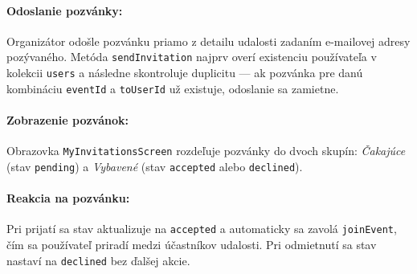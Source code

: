   \paragraph{Odoslanie pozvánky:}
  Organizátor odošle pozvánku priamo z detailu udalosti zadaním
  e-mailovej adresy pozývaného. Metóda \texttt{sendInvitation} najprv
  overí existenciu používateľa v kolekcii \texttt{users} a následne
  skontroluje duplicitu — ak pozvánka pre danú kombináciu
  \texttt{eventId} a \texttt{toUserId} už existuje, odoslanie sa zamietne.

  \paragraph{Zobrazenie pozvánok:}
  Obrazovka \texttt{MyInvitationsScreen} rozdeľuje pozvánky do dvoch
  skupín: \textit{Čakajúce} (stav \texttt{pending}) a \textit{Vybavené}
  (stav \texttt{accepted} alebo \texttt{declined}).

  \paragraph{Reakcia na pozvánku:}
  Pri prijatí sa stav aktualizuje na \texttt{accepted} a automaticky
  sa zavolá \texttt{joinEvent}, čím sa používateľ priradí medzi
  účastníkov udalosti. Pri odmietnutí sa stav nastaví na
  \texttt{declined} bez ďalšej akcie.